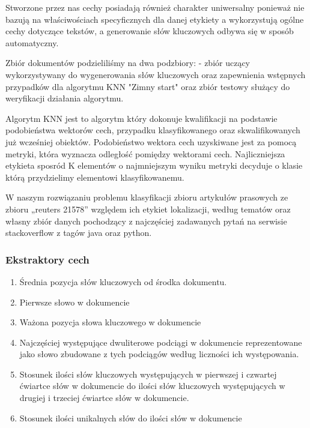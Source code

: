 \documentclass{classrep}
\begin{document}
Stworzone przez nas cechy posiadają również charakter uniwersalny ponieważ nie bazują na właściwościach specyficznych dla danej etykiety a wykorzystują ogólne cechy dotyczące tekstów, a generowanie słów kluczowych odbywa się w sposób automatyczny.


Zbiór dokumentów podzieliliśmy na dwa podzbiory:
- zbiór uczący wykorzystywany do wygenerowania słów kluczowych oraz zapewnienia wstępnych przypadków dla algorytmu KNN "Zimny start" oraz zbiór testowy służący do weryfikacji działania algorytmu.


Algorytm KNN jest to algorytm który dokonuje kwalifikacji na podstawie podobieństwa wektorów cech, przypadku klasyfikowanego oraz skwalifikowanych już wcześniej obiektów.
Podobieństwo wektora cech uzyskiwane jest za pomocą metryki, która wyznacza odległość pomiędzy wektorami cech.
Najliczniejsza etykieta sposród K elementów o najmniejszym wyniku metryki decyduje o klasie którą przydzielimy elementowi klasyfikowanemu.


W naszym rozwiązaniu problemu klasyfikacji zbioru artykułów prasowych ze zbioru „reuters 21578” względem ich etykiet lokalizacji, według tematów oraz własny zbiór danych pochodzący z najczęściej zadawanych pytań na serwisie stackoverflow z tagów java oraz python.

\subsubsection{Ekstraktory cech}
\begin{enumerate}
  \item Średnia pozycja słów kluczowych od środka dokumentu.

  \item Pierwsze słowo w dokumencie
  \item Ważona pozycja słowa kluczowego w dokumencie
   \item Najczęściej występujące dwuliterowe podciągi w dokumencie
reprezentowane jako słowo zbudowane z tych podciągów według liczności ich występowania.

  \item Stosunek ilości słów kluczowych występujących w pierwszej i czwartej ćwiartce słów w dokumencie do ilości słów kluczowych występujących w drugiej i trzeciej ćwiartce słów w dokumencie.
  
    \item Stosunek ilości unikalnych słów do ilości słów w dokumencie
\end{enumerate}
\end{document}

